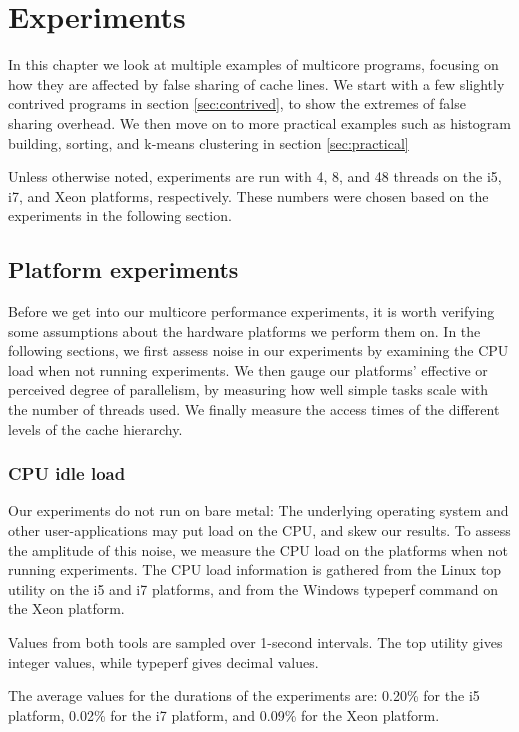 \chapter{Experiments}
\label{chap:experiments}

In this chapter we look at multiple examples of multicore programs, focusing on
how they are affected by false sharing of cache lines. We start with a few
slightly contrived programs in section \ref{sec:contrived}, to show the extremes
of false sharing overhead. We then move on to more practical examples such as
histogram building, sorting, and k-means clustering in section
\ref{sec:practical}

Unless otherwise noted, experiments are run with 4, 8, and 48 threads on the i5,
i7, and Xeon platforms, respectively. These numbers were chosen based on the
experiments in the following section.

\section{Platform experiments}
Before we get into our multicore performance experiments, it is worth verifying
some assumptions about the hardware platforms we perform them on. In the
following sections, we first assess noise in our experiments by examining the CPU
load when not running experiments. We then gauge our platforms' effective or
perceived degree of parallelism, by measuring how well simple tasks scale with the
number of threads used. We finally measure the access times of the different
levels of the cache hierarchy.

\subsection{CPU idle load}
Our experiments do not run on bare metal: The underlying operating system and
other user-applications may put load on the CPU, and skew our results.
To assess the amplitude of this noise, we measure the CPU load on the platforms
when not running experiments.
The CPU load information is gathered from the Linux top utility on the
i5 and i7 platforms, and from the Windows typeperf command on the Xeon
platform.

Values from both tools are sampled over 1-second intervals. The top
utility gives integer values, while typeperf gives decimal values.

The average values for the durations of the experiments are: 0.20\% for the i5
platform, 0.02\% for the i7 platform, and 0.09\% for the Xeon platform.

